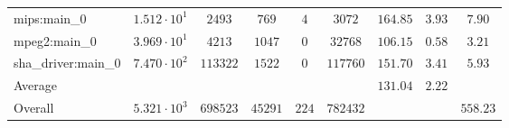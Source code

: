 \begin{tabular}{|l|c|c|c|c|c|c|c|c|}
mips:main\_0            & $ 1.512 \cdot 10^{1}  $ & $ 2493   $ & $ 769   $ & $ 4   $ & $ 3072   $ & $ 164.85      $ & $ 3.93    $ & $ 7.90    $ \\
mpeg2:main\_0           & $ 3.969 \cdot 10^{1}  $ & $ 4213   $ & $ 1047  $ & $ 0   $ & $ 32768  $ & $ 106.15      $ & $ 0.58    $ & $ 3.21    $ \\
sha\_driver:main\_0     & $ 7.470 \cdot 10^{2}  $ & $ 113322 $ & $ 1522  $ & $ 0   $ & $ 117760 $ & $ 151.70      $ & $ 3.41    $ & $ 5.93    $ \\
\hline
Average                 & $                     $ & $        $ & $       $ & $     $ & $        $ & $ 131.04      $ & $ 2.22    $ & $         $ \\
\hline
Overall                 & $ 5.321 \cdot 10^{3}  $ & $ 698523 $ & $ 45291 $ & $ 224 $ & $ 782432 $ & $             $ & $         $ & $ 558.23  $ \\
\hline
\end{tabular}
